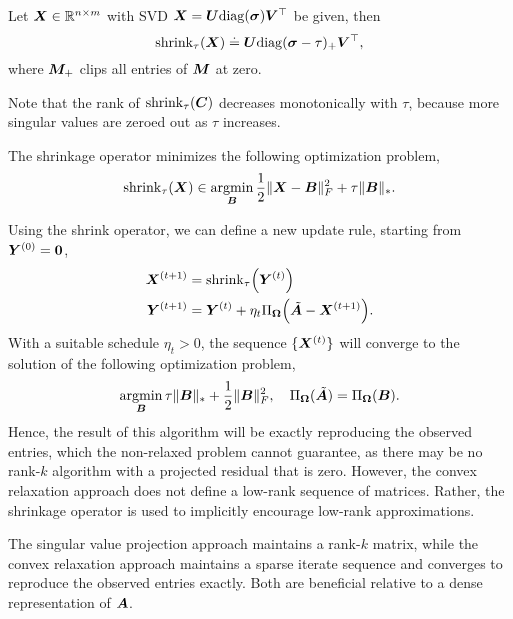 \begin{definition}
    Let $\bm{X} \in \mathbb{R}^{n\times m}$ with SVD $\bm{X} = \bm{U} \mathrm{diag}(\bm{\sigma})
        \bm{V}^\top$ be given, then \[
        \mathrm{shrink}_{\tau}(\bm{X}) \doteq \bm{U}\mathrm{diag}(\bm{\sigma} - \tau)_+ \bm{V}^\top,
    \]
    where $\bm{M}_+$ clips all entries of $\bm{M}$ at zero.
\end{definition}
Note that the rank of $\mathrm{shrink}_{\tau}(\bm{C})$ decreases monotonically with $\tau$, because
more singular values are zeroed out as $\tau$ increases.

\begin{theorem}
    The shrinkage operator minimizes the following optimization problem, \[
        \mathrm{shrink}_{\tau}(\bm{X}) \in \operatorname*{argmin}_{\bm{B}} \frac{1}{2} \| \bm{X} - \bm{B} \|_F^2 + \tau \| \bm{B} \|_*.
    \]
\end{theorem}

Using the shrink operator, we can define a new update rule, starting from $\bm{Y}^{(0)} =
    \bm{0}$,
\begin{align*}
    \mat{X}^{(t+1)} & = \mathrm{shrink}_{\tau}\lft( \mat{Y}^{(t)} \rgt)                                         \\
    \mat{Y}^{(t+1)} & = \mat{Y}^{(t)} + \eta_t \Pi_{\mat{\Omega}}\lft( \tilde{\mat{A}} - \mat{X}^{(t+1)} \rgt).
\end{align*}
With a suitable schedule $\eta_t > 0$, the sequence $\{ \bm{X}^{(t)} \}$ will converge to the solution of the following optimization problem, \[
    \operatorname*{argmin}_{\bm{B}} \tau \| \bm{B} \|_* + \frac{1}{2} \| \bm{B} \|_F^2, \quad \Pi_{\bm{\Omega}}(\tilde{\bm{A}}) = \Pi_{\bm{\Omega}}(\bm{B}).
\]
Hence, the result of this algorithm will be exactly reproducing the observed entries, which the
non-relaxed problem cannot guarantee, as there may be no rank-$k$ algorithm with a projected
residual that is zero. However, the convex relaxation approach does not define a low-rank sequence
of matrices. Rather, the shrinkage operator is used to implicitly encourage low-rank
approximations.

\begin{important}
    The singular value projection approach maintains a rank-$k$ matrix, while the convex
    relaxation approach maintains a sparse iterate sequence and converges to reproduce the observed
    entries exactly. Both are beneficial relative to a dense representation of $\bm{A}$.
\end{important}

